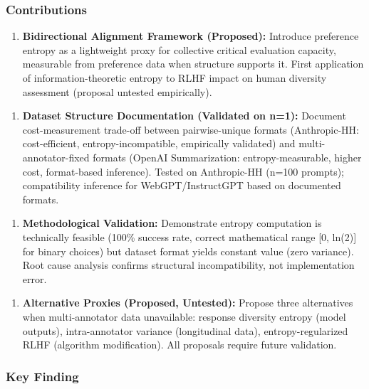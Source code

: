 \subsubsection{Contributions}

\begin{enumerate}
\item \textbf{Bidirectional Alignment Framework (Proposed):} Introduce preference entropy as a lightweight proxy for collective critical evaluation capacity, measurable from preference data when structure supports it. First application of information-theoretic entropy to RLHF impact on human diversity assessment (proposal untested empirically).
\end{enumerate}

\begin{enumerate}
\item \textbf{Dataset Structure Documentation (Validated on n=1):} Document cost-measurement trade-off between pairwise-unique formats (Anthropic-HH: cost-efficient, entropy-incompatible, empirically validated) and multi-annotator-fixed formats (OpenAI Summarization: entropy-measurable, higher cost, format-based inference). Tested on Anthropic-HH (n=100 prompts); compatibility inference for WebGPT/InstructGPT based on documented formats.
\end{enumerate}

\begin{enumerate}
\item \textbf{Methodological Validation:} Demonstrate entropy computation is technically feasible (100\% success rate, correct mathematical range [0, ln(2)] for binary choices) but dataset format yields constant value (zero variance). Root cause analysis confirms structural incompatibility, not implementation error.
\end{enumerate}

\begin{enumerate}
\item \textbf{Alternative Proxies (Proposed, Untested):} Propose three alternatives when multi-annotator data unavailable: response diversity entropy (model outputs), intra-annotator variance (longitudinal data), entropy-regularized RLHF (algorithm modification). All proposals require future validation.
\end{enumerate}

\subsubsection{Key Finding}

